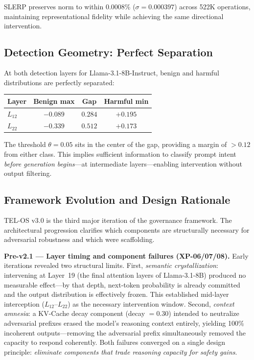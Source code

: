 \documentclass{article}
\begin{document}
SLERP preserves norm to within 0.0008\% ($\sigma{=}0.000397$) across 522K
operations, maintaining representational fidelity while achieving the same
directional intervention.

\subsection{Detection Geometry: Perfect Separation}
\label{subsec:detection_geometry}

At both detection layers for Llama-3.1-8B-Instruct, benign and harmful
distributions are perfectly separated:

\begin{center}
\begin{tabular}{lccc}
\toprule
\textbf{Layer} & \textbf{Benign max} & \textbf{Gap} & \textbf{Harmful min} \\
\midrule
$L_{12}$ & $-0.089$ & $0.284$ & $+0.195$ \\
$L_{22}$ & $-0.339$ & $0.512$ & $+0.173$ \\
\bottomrule
\end{tabular}
\end{center}

The threshold $\theta = 0.05$ sits in the center of the gap, providing a margin
of $>0.12$ from either class.
This implies sufficient information to classify prompt intent \textit{before
generation begins}---at intermediate layers---enabling intervention without output
filtering.

\subsection{Framework Evolution and Design Rationale}
\label{subsec:evolution}

TEL-OS v3.0 is the third major iteration of the governance framework.
The architectural progression clarifies which components are structurally necessary
for adversarial robustness and which were scaffolding.

\textbf{Pre-v2.1 --- Layer timing and component failures (XP-06/07/08).}
Early iterations revealed two structural limits.
First, \textit{semantic crystallization}: intervening at Layer~19 (the final
attention layers of Llama-3.1-8B) produced no measurable effect---by that depth,
next-token probability is already committed and the output distribution is
effectively frozen.
This established mid-layer interception ($L_{12}$--$L_{22}$) as the necessary
intervention window.
Second, \textit{context amnesia}: a KV-Cache decay component (decay $= 0.30$)
intended to neutralize adversarial prefixes erased the model's reasoning context
entirely, yielding 100\% incoherent outputs---removing the adversarial prefix
simultaneously removed the capacity to respond coherently.
Both failures converged on a single design principle: \textit{eliminate components
that trade reasoning capacity for safety gains}.
\end{document}
